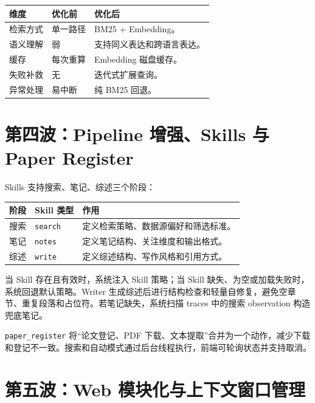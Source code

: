\documentclass[12pt,a4paper,onecolumn]{ctexart}
\newcommand{\code}[1]{\texttt{#1}}
\begin{document}
\begin{longtable}{p{3.4cm}p{4.8cm}p{4.8cm}}
\toprule
\textbf{维度} & \textbf{优化前} & \textbf{优化后} \\
\midrule
检索方式 & 单一路径 & BM25 + Embedding。\\
语义理解 & 弱 & 支持同义表达和跨语言表达。\\
缓存 & 每次重算 & Embedding 磁盘缓存。\\
失败补救 & 无 & 迭代式扩展查询。\\
异常处理 & 易中断 & 纯 BM25 回退。\\
\bottomrule
\end{longtable}

\section{第四波：Pipeline 增强、Skills 与 Paper Register}

Skills 支持搜索、笔记、综述三个阶段：

\begin{longtable}{p{2.5cm}p{3.5cm}p{6.5cm}}
\toprule
\textbf{阶段} & \textbf{Skill 类型} & \textbf{作用} \\
\midrule
搜索 & \code{search} & 定义检索策略、数据源偏好和筛选标准。\\
笔记 & \code{notes} & 定义笔记结构、关注维度和输出格式。\\
综述 & \code{write} & 定义综述结构、写作风格和引用方式。\\
\bottomrule
\end{longtable}

当 Skill 存在且有效时，系统注入 Skill 策略；当 Skill 缺失、为空或加载失败时，系统回退默认策略。Writer 生成综述后进行结构检查和轻量自修复，避免空章节、重复段落和占位符。若笔记缺失，系统扫描 traces 中的搜索 observation 构造兜底笔记。

\code{paper\_register} 将“论文登记、PDF 下载、文本提取”合并为一个动作，减少下载和登记不一致。搜索和自动模式通过后台线程执行，前端可轮询状态并支持取消。

\section{第五波：Web 模块化与上下文窗口管理}
\end{document}
